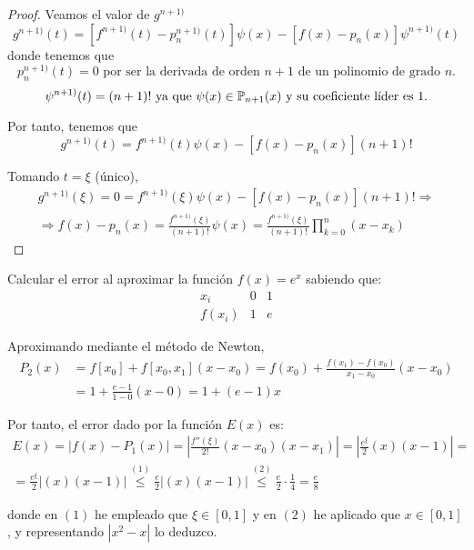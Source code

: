 \begin{proof}
    Veamos el valor de $g^{n+1)}$
    \begin{equation*}
        g^{n+1)}(t) = [f^{n+1)}(t)-{p_n^{n+1)}}(t)]\psi(x) - [f(x)-p_n(x)]\psi^{n+1)}(t)
    \end{equation*}
    donde tenemos que 
    \begin{equation*}
        {p_n^{n+1)}}(t) = 0\text{ por ser la derivada de orden $n+1$ de un polinomio de grado $n$.}
    \end{equation*}
    \begin{equation*}
        \psi^{n+1)}(t) = (n+1)!\text{ ya que $\psi (x) \in \mathbb{P}_{n+1}(x)$ y su coeficiente líder es $1$.}
    \end{equation*}

    Por tanto, tenemos que
    \begin{equation*}
        g^{n+1)}(t) = f^{n+1)}(t)\psi(x) - [f(x)-p_n(x)](n+1)!
    \end{equation*}

    Tomando $t=\xi$ (único), 
    \begin{multline*}
        g^{n+1)}(\xi) = 0 = f^{n+1)}(\xi)\psi(x) - [f(x)-p_n(x)](n+1)!
        \Longrightarrow\\ \Longrightarrow
        f(x)-p_n(x) = \frac{f^{n+1)}(\xi)}{(n+1)!}\psi(x) = \frac{f^{n+1)}(\xi)}{(n+1)!}\prod_{k=0}^n (x-x_k)
    \end{multline*}
\end{proof}

\begin{ejemplo}
    Calcular el error al aproximar la función $f(x)=e^x$ sabiendo que:
    \begin{equation*}
        \begin{array}{c|cc}
            x_i & 0 & 1 \\ \hline
            f(x_i) & 1 & e
        \end{array}
    \end{equation*}

    Aproximando mediante el método de Newton,
    \begin{equation*}\begin{split}
        P_2(x)&
        = f[x_0] + f[x_0,x_1](x-x_0)
        = f(x_0) + \frac{f(x_1) - f(x_0)}{x_1 - x_0} (x-x_0) \\
        &= 1 + \frac{e - 1}{1-0} (x-0)
        = 1+(e-1)x
    \end{split}\end{equation*}

    Por tanto, el error dado por la función $E(x)$ es:
    \begin{multline*}
        E(x) = |f(x) - P_1(x)| = \left| \frac{f''(\xi)}{2!} (x-x_0) (x-x_1)\right|
        = \left |\frac{e^\xi}{2} (x) (x-1)\right|
        =\\=
        \frac{e^\xi}{2} \left |(x) (x-1)\right|
        \stackrel{(1)}{\leq} \frac{e}{2} \left |(x) (x-1)\right|
        \stackrel{(2)}{\leq} \frac{e}{2}\cdot  \frac{1}{4} = \frac{e}{8}
    \end{multline*}

    donde en $(1)$ he empleado que $\xi \in [0,1]$ y en $(2)$ he aplicado que $x\in[0,1]$, y representando $|x^2-x|$ lo deduzco.
\end{ejemplo}

